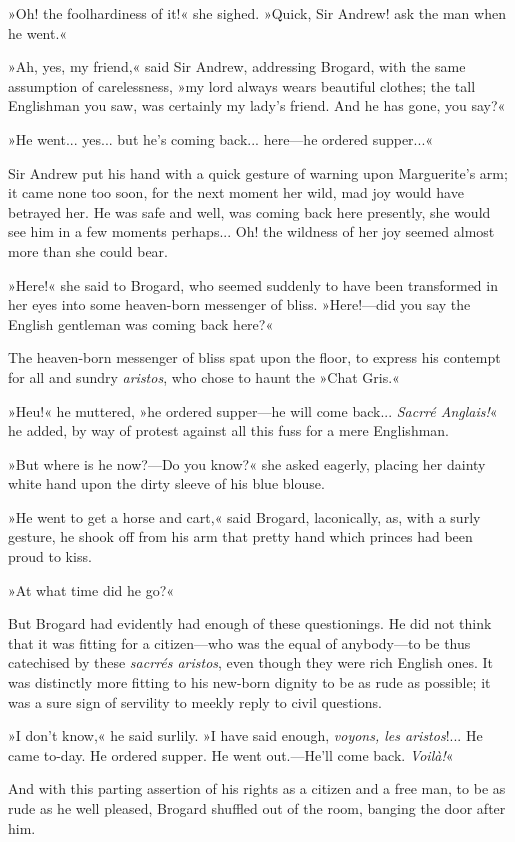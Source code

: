 »Oh! the foolhardiness of it!« she sighed. »Quick, Sir Andrew! ask the man when he went.«

»Ah, yes, my friend,« said Sir Andrew, addressing Brogard, with the same assumption of carelessness, »my lord always wears beautiful clothes; the tall Englishman you saw, was certainly my lady's friend. And he has gone, you say?«

»He went... yes... but he's coming back... here\allowbreak---\allowbreak he ordered supper...«

Sir Andrew put his hand with a quick gesture of warning upon Marguerite's arm; it came none too soon, for the next moment her wild, mad joy would have betrayed her. He was safe and well, was coming back here presently, she would see him in a few moments perhaps... Oh! the wildness of her joy seemed almost more than she could bear.

»Here!« she said to Brogard, who seemed suddenly to have been transformed in her eyes into some heaven-born messenger of bliss. »Here!\allowbreak---\allowbreak did you say the English gentleman was coming back here?«

The heaven-born messenger of bliss spat upon the floor, to express his contempt for all and sundry \textit{aristos}, who chose to haunt the »Chat Gris.«

»Heu!« he muttered, »he ordered supper\allowbreak---\allowbreak he will come back... \textit{Sacrré Anglais!}« he added, by way of protest against all this fuss for a mere Englishman.

»But where is he now?\allowbreak---\allowbreak Do you know?« she asked eagerly, placing her dainty white hand upon the dirty sleeve of his blue blouse.

»He went to get a horse and cart,« said Brogard, laconically, as, with a surly gesture, he shook off from his arm that pretty hand which princes had been proud to kiss.

»At what time did he go?«

But Brogard had evidently had enough of these questionings. He did not think that it was fitting for a citizen\allowbreak---\allowbreak who was the equal of anybody\allowbreak---\allowbreak to be thus catechised by these \textit{sacrrés aristos}, even though they were rich English ones. It was distinctly more fitting to his new-born dignity to be as rude as possible; it was a sure sign of servility to meekly reply to civil questions.

»I don't know,« he said surlily. »I have said enough, \textit{voyons, les aristos}!... He came to-day. He ordered supper. He went out.\allowbreak---\allowbreak He'll come back. \textit{Voilà!}«

And with this parting assertion of his rights as a citizen and a free man, to be as rude as he well pleased, Brogard shuffled out of the room, banging the door after him.